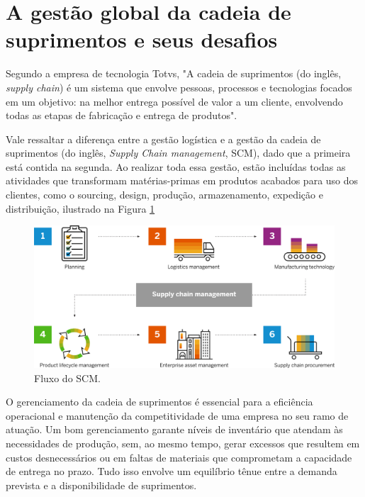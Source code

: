 \section{A gestão global da cadeia de suprimentos e seus desafios}

Segundo a empresa de tecnologia Totvs, "A cadeia de suprimentos (do inglês, \textit{supply chain}) é um sistema que envolve pessoas, processos e tecnologias focados em um objetivo: na melhor entrega possível de valor a um cliente, envolvendo todas as etapas de fabricação e entrega de produtos". 

Vale ressaltar a diferença entre a gestão logística e a gestão da cadeia de suprimentos (do inglês, \textit{Supply Chain management}, SCM), dado que a primeira está contida na segunda. Ao realizar toda essa gestão, estão incluídas todas as atividades que transformam matérias-primas em  produtos acabados para uso dos clientes, como o sourcing, design, produção, armazenamento, expedição e distribuição, ilustrado na Figura \ref{fig:Fig_1}

\begin{figure}[htb]
	\caption{\label{fig:Fig_1}Fluxo do SCM.}
	\begin{center}
		\includegraphics[scale=0.2]{figuras/what-is-supply-chain-management-graphic.png}
	\end{center}
\end{figure}

O gerenciamento da cadeia de suprimentos é essencial para a eficiência operacional e manutenção da competitividade de uma empresa no seu ramo de atuação. Um bom gerenciamento garante níveis de inventário que atendam às necessidades de produção, sem, ao mesmo tempo, gerar excessos que resultem em custos desnecessários ou em faltas de materiais que comprometam a capacidade de entrega no prazo. Tudo isso envolve um equilíbrio tênue entre a demanda prevista e a disponibilidade de suprimentos. 

